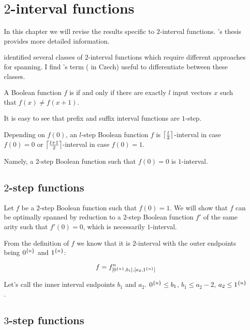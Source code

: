 \chapter{\texorpdfstring{$2$}{2}-interval functions}

In this chapter we will revise the results specific to
$2$-interval functions.
\dubovsky{}'s
thesis\cite{Dubovsky2012}
provides more detailed information.

\dubovsky{} identified several classes
of $2$-interval functions
which require different approaches for spanning.
I find \husek{}'s term \cite[p.~13]{Husek2014}
( in Czech)
useful to differentiate between these classes.

\begin{definition}
A Boolean function $f$ is 
if and only if
there are exactly $l$ input vectors $x$ such that
$f(x) \neq f(x+1)$.
\end{definition}

It is easy to see that
prefix and suffix interval functions are $1$-step.

Depending on $f(0)$,
an $l$-step Boolean function $f$
is $\ceil*{\frac{l}{2}}$-interval in case $f(0) = 0$
or $\ceil*{\frac{l+1}{2}}$-interval in case $f(0) = 1$.

Namely,
a $2$-step Boolean function such that $f(0) = 0$
is $1$-interval.

\section{\texorpdfstring{$2$}{2}-step functions}

Let $f$ be a $2$-step Boolean function
such that $f(0) = 1$.
We will show that $f$
can be optimally spanned by reduction to
a $2$-step Boolean function $f'$ of the same arity
such that $f'(0) = 0$,
which is necessarily $1$-interval.

From the definition of $f$ we know that it is $2$-interval
with the outer endpoints being
$\rep{0}{n}$ and $\rep{1}{n}$:

\[
f = f^n_{\interval{\rep{0}{n}}{b_1},
\interval{a_2}{\rep{1}{n}}}
\]

Let's call the inner interval endpoints $b_1$ and $a_2$.
$\rep{0}{n} \leq b_1$,
$b_1 \leq a_2 - 2$,
$a_2 \leq \rep{1}{n}$.

\section{\texorpdfstring{$3$}{3}-step functions}

